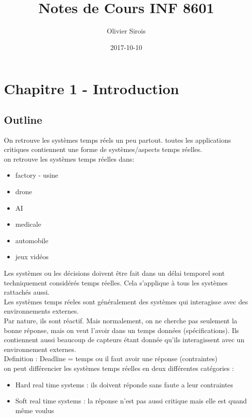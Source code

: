 \documentclass[oneside]{book}
\title{Notes de Cours INF 8601}
\date{2017-10-10}
\author{Olivier Sirois}
\begin{document}
    \setcounter{page}{1}
    \maketitle
    \tableofcontents
    \chapter{Chapitre 1 - Introduction}
    
    \section[Info]{Outline}
    On retrouve les systèmes temps réels un peu partout. toutes les applications critiques contiennent une forme de systèmes/aspects temps réelles.\\
    
    on retrouve les systèmes temps réelles dans:
    \begin{itemize}
        \item factory - usine
        \item drone
        \item AI
        \item medicale
        \item automobile
        \item jeux vidéos
    \end{itemize}

    Les systèmes ou les décisions doivent être fait dans un délai temporel sont techniquement considérés temps réelles. Cela s'applique à tous les systèmes rattachés aussi.\\
    
    Les systèmes temps réeles sont généralement des systèmes qui interagisse avec des environnements externes.\\
    
    Par nature, ils sont réactif. Mais normalement, on ne cherche pas seulement la bonne réponse, mais on veut l'avoir dans un temps données (spécifications). Ils contiennent aussi beaucoup de capteurs étant donnée qu'ils interagissent avec un environnement externes.\\
    
    Definition : Deadline  = temps ou il faut avoir une réponse (contraintes)\\
    
    on peut différencier les systèmes temps réelles en deux différentes catégories :
    \begin{itemize}
        \item Hard real time systems : ils doivent réponde sans faute a leur contraintes
        \item Soft real time systems : la réponse n'est pas aussi critique mais elle est quand même voulus
    \end{itemize}
       
\end{document}
